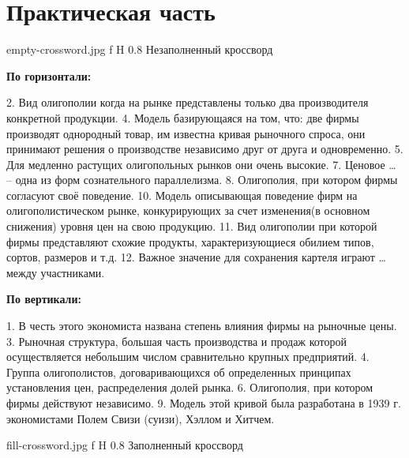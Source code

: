 \chapter{Практическая часть}

{empty-crossword.jpg}
{f}
{H}
{0.8\textwidth}
{Незаполненный кроссворд}

\textbf{По горизонтали:}

2. Вид олигополии когда на рынке представлены только два производителя конкретной продукции.
4. Модель базирующаяся на том, что: две фирмы производят однородный товар, им известна кривая рыночного спроса, они принимают решения о производстве независимо друг от друга и одновременно.
5. Для медленно растущих олигопольных рынков они очень высокие.
7. Ценовое … -- одна из форм сознательного параллелизма.
8. Олигополия, при котором фирмы согласуют своё поведение.
10. Модель описывающая поведение фирм на олигополистическом рынке, конкурирующих за счет изменения(в основном снижения) уровня цен на свою продукцию.
11. Вид олигополии при которой фирмы представляют схожие продукты, характеризующиеся обилием типов, сортов, размеров и т.д.
12. Важное значение для сохранения картеля играют … между участниками.

\textbf{По вертикали:}

1. В честь этого экономиста названа степень влияния фирмы на рыночные цены.
3. Рыночная структура, большая часть производства и продаж которой осуществляется небольшим числом сравнительно крупных предприятий.
4. Группа олигополистов, договаривающихся об определенных принципах установления цен, распределения долей рынка.
6. Олигополия, при котором фирмы действуют независимо.
9. Модель этой кривой была разработана в 1939 г. экономистами Полем Свизи (суизи), Хэллом и Хитчем.

{fill-crossword.jpg}
{f}
{H}
{0.8\textwidth}
{Заполненный кроссворд}
